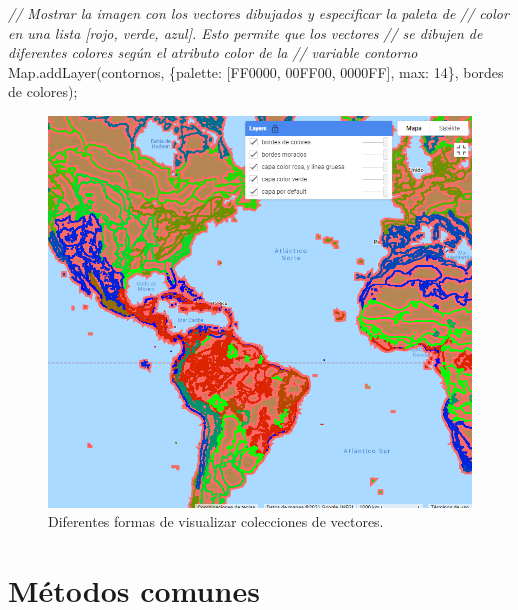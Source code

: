 \documentclass[
  12pt,
  letterpaper,
  twoside]{book}
\newenvironment{Shaded}{\begin{snugshade}}{\end{snugshade}}
\newcommand{\CommentTok}[1]{\textcolor[rgb]{0.24,0.58,0.00}{\textit{#1}}}
\newcommand{\DataTypeTok}[1]{\textcolor[rgb]{0.00,0.00,0.00}{#1}}
\newcommand{\DecValTok}[1]{\textcolor[rgb]{0.28,0.53,0.93}{#1}}
\newcommand{\FunctionTok}[1]{\textcolor[rgb]{0.48,0.12,0.64}{#1}}
\newcommand{\KeywordTok}[1]{\textcolor[rgb]{0.48,0.12,0.64}{#1}}
\newcommand{\NormalTok}[1]{#1}
\newcommand{\OperatorTok}[1]{\textcolor[rgb]{0.00,0.00,0.00}{#1}}
\newcommand{\StringTok}[1]{\textcolor[rgb]{0.87,0.29,0.22}{#1}}
\begin{document}
\begin{Shaded}
\begin{Highlighting}[]
\CommentTok{// Mostrar la imagen con los vectores dibujados y especificar la paleta de}
\CommentTok{// color en una lista [rojo, verde, azul]. Esto permite que los vectores }
\CommentTok{// se dibujen de diferentes colores según el atributo \textquotesingle{}color\textquotesingle{} de la }
\CommentTok{// variable \textquotesingle{}contorno\textquotesingle{}}
\KeywordTok{Map}\OperatorTok{.}\FunctionTok{addLayer}\NormalTok{(contornos}\OperatorTok{,}\NormalTok{ \{}\DataTypeTok{palette}\OperatorTok{:}\NormalTok{ [}\StringTok{\textquotesingle{}FF0000\textquotesingle{}}\OperatorTok{,} \StringTok{\textquotesingle{}00FF00\textquotesingle{}}\OperatorTok{,} \StringTok{\textquotesingle{}0000FF\textquotesingle{}}\NormalTok{]}\OperatorTok{,} 
  \DataTypeTok{max}\OperatorTok{:} \DecValTok{14}\NormalTok{\}}\OperatorTok{,} \StringTok{\textquotesingle{}bordes de colores\textquotesingle{}}\NormalTok{)}\OperatorTok{;} 
\end{Highlighting}
\end{Shaded}

\begin{figure}[H]

{\centering \includegraphics[width=0.8\linewidth]{Img/ej17} 

}

\caption{Diferentes formas de visualizar colecciones de vectores.}\label{fig:f85}
\end{figure}
\newpage

\hypertarget{muxe9todos-comunes-2}{%
\section{Métodos comunes}\label{muxe9todos-comunes-2}}
\end{document}
